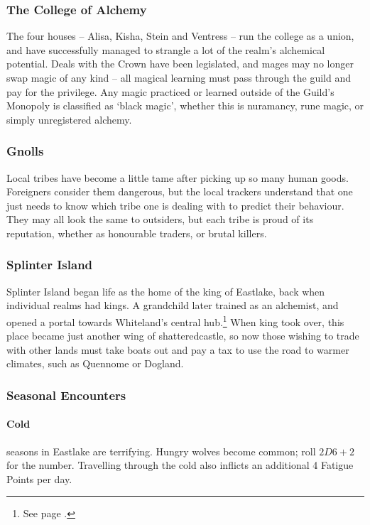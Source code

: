 \begin{multicols}{2}
\subsubsection{The College of Alchemy}

The four houses -- Alisa, Kisha, Stein and Ventress -- run the college as a union, and have successfully managed to strangle a lot of the realm's alchemical potential.
Deals with the Crown have been legislated, and mages may no longer swap magic of any kind -- all magical learning must pass through the guild and pay for the privilege.
Any magic practiced or learned outside of the Guild's Monopoly is classified as `black magic', whether this is nuramancy, rune magic, or simply unregistered alchemy.

\subsubsection{Gnolls}

Local tribes have become a little tame after picking up so many human goods.
Foreigners consider them dangerous, but the local trackers understand that one just needs to know which tribe one is dealing with to predict their behaviour.
They may all look the same to outsiders, but each tribe is proud of its reputation, whether as honourable traders, or brutal killers.

\subsubsection{Splinter Island}

Splinter Island began life as the home of the king of Eastlake, back when individual realms had kings.
A grandchild later trained as an alchemist, and opened a portal towards Whiteland's central hub.\footnote{See page \pageref{whiteland_heart}.}
When \gls{king} took over, this place became just another wing of \gls{shatteredcastle}, so now those wishing to trade with other lands must take boats out and pay a tax to use the road to warmer climates, such as Quennome or Dogland.

\subsubsection{Seasonal Encounters}

\paragraph{Cold} seasons in Eastlake are terrifying.
Hungry wolves become common; roll $2D6 + 2$ for the number.
Travelling through the cold also inflicts an additional 4 Fatigue Points per day.

\end{multicols}
